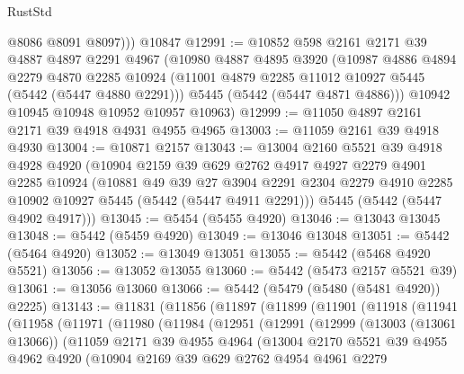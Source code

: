 \begin{lexlean}{RustStd}
\begin{coremodule}
          @8086
          @8091
          @8097)))
    @10847
@12991 := @10852
    @598
    @2161
    @2171
    @39
    @4887
    @4897
    @2291
    @4967
    (@10980
      @4887
      @4895
      @3920
      (@10987
        @4886
        @4894
        @2279
        @4870
        @2285
        @10924
        (@11001 @4879 @2285 @11012 @10927 @5445 (@5442 (@5447 @4880 @2291)))
        @5445
        (@5442 (@5447 @4871 @4886)))
      @10942
      @10945
      @10948
      @10952
      @10957
      @10963)
@12999 := @11050 @4897 @2161 @2171 @39 @4918 @4931 @4955 @4965
@13003 := @11059 @2161 @39 @4918 @4930
@13004 := @10871 @2157
@13043 := @13004
    @2160
    @5521
    @39
    @4918
    @4928
    @4920
    (@10904
      @2159
      @39
      @629
      @2762
      @4917
      @4927
      @2279
      @4901
      @2285
      @10924
      (@10881
        @49
        @39
        @27
        @3904
        @2291
        @2304
        @2279
        @4910
        @2285
        @10902
        @10927
        @5445
        (@5442 (@5447 @4911 @2291)))
      @5445
      (@5442 (@5447 @4902 @4917)))
@13045 := @5454 (@5455 @4920)
@13046 := @13043 @13045
@13048 := @5442 (@5459 @4920)
@13049 := @13046 @13048
@13051 := @5442 (@5464 @4920)
@13052 := @13049 @13051
@13055 := @5442 (@5468 @4920 @5521)
@13056 := @13052 @13055
@13060 := @5442 (@5473 @2157 @5521 @39)
@13061 := @13056 @13060
@13066 := @5442 (@5479 (@5480 (@5481 @4920)) @2225)
@13143 := @11831
    (@11856
      (@11897
        (@11899
          (@11901
            (@11918
              (@11941
                (@11958
                  (@11971
                    (@11980
                      (@11984
                        (@12951
                          (@12991
                            (@12999
                              (@13003 (@13061 @13066))
                              (@11059
                                @2171
                                @39
                                @4955
                                @4964
                                (@13004
                                  @2170
                                  @5521
                                  @39
                                  @4955
                                  @4962
                                  @4920
                                  (@10904
                                    @2169
                                    @39
                                    @629
                                    @2762
                                    @4954
                                    @4961
                                    @2279

\end{coremodule}
\end{lexlean}

